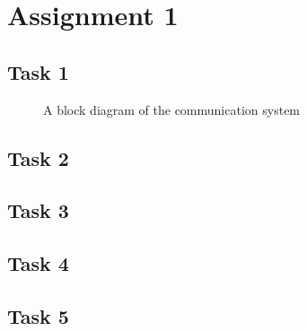 \documentclass[11pt,titlepage]{report}
\begin{document}
\chapter{Assignment 1}
\section{Task 1}
\begin{figure}[H]
	\centering
	
	\caption{A block diagram of the communication system}
	\label{fig:block-diagram}
\end{figure}

\section{Task 2}

\section{Task 3}

\section{Task 4}

\section{Task 5}
\end{document}
